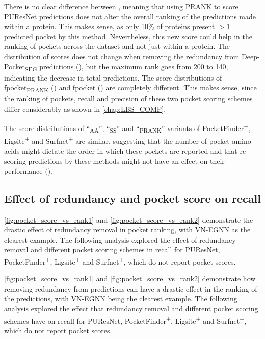 There is no clear difference between , meaning that using PRANK to score PUResNet predictions does not alter the overall ranking of the predictions made within a protein. This makes sense, as only 10\% of proteins present $>$1 predicted pocket by this method. Nevertheless, this new score could help in the ranking of pockets across the dataset and not just within a protein. The distribution of scores does not change when removing the redundancy from Deep-Pocket\textsubscript{SEG} predictions (), but the maximum rank goes from 200 to 140, indicating the decrease in total predictions. The score distributions of fpocket\textsubscript{PRANK} () and fpocket () are completely different. This makes sense, since the ranking of pockets, recall and precision of these two pocket scoring schemes differ considerably as shown in \autoref{chap:LBS_COMP}.

The score distributions of ``\textsubscript{AA}'', ``\textsubscript{SS}'' and ``\textsubscript{PRANK}'' variants of PocketFinder\textsuperscript{+}, Ligsite\textsuperscript{+} and Surfnet\textsuperscript{+} are similar, suggesting that the number of pocket amino acids might dictate the order in which these pockets are reported and that re-scoring predictions by these methods might not have an effect on their performance ().

\subsection{Effect of redundancy and pocket score on recall}

\autoref{fig:pocket_score_vs_rank1} and \autoref{fig:pocket_score_vs_rank2} demonstrate the drastic effect of redundancy removal in pocket ranking, with VN-EGNN as the clearest example. The following analysis explored the effect of redundancy removal and different pocket scoring schemes in recall for PUResNet, PocketFinder\textsuperscript{+}, Ligsite\textsuperscript{+} and Surfnet\textsuperscript{+}, which do not report pocket scores.

\autoref{fig:pocket_score_vs_rank1} and \autoref{fig:pocket_score_vs_rank2} demonstrate how removing redundancy from predictions can have a drastic effect in the ranking of the predictions, with VN-EGNN being the clearest example. The following analysis explored the effect that redundancy removal and different pocket scoring schemes have on recall for PUResNet, PocketFinder\textsuperscript{+}, Ligsite\textsuperscript{+} and Surfnet\textsuperscript{+}, which do not report pocket scores.

